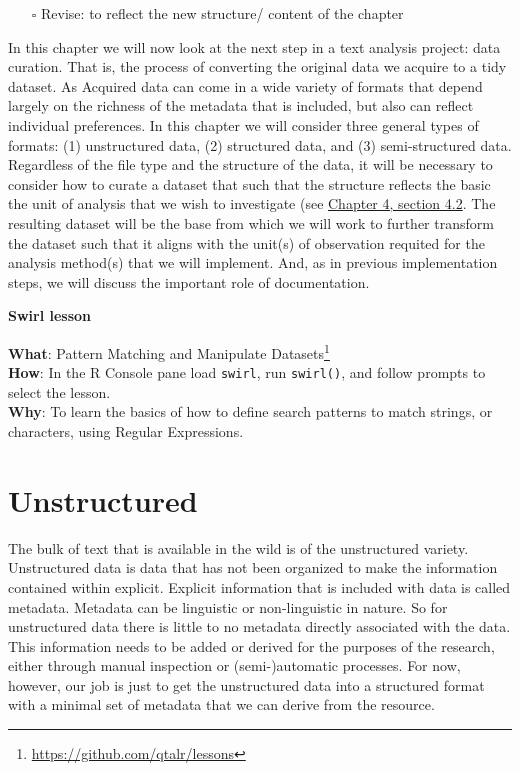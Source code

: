 \documentclass[
  letterpaper,
  DIV=11,
  numbers=noendperiod]{scrreport}
\providecommand{\tightlist}{%
  \setlength{\itemsep}{0pt}\setlength{\parskip}{0pt}}\usepackage{longtable,booktabs,array}
\theoremstyle{definition}
\theoremstyle{remark}
\DeclareRobustCommand{\href}[2]{#2\footnote{\url{#1}}}
\begin{document}
\begin{itemize}
\tightlist
\item[$\square$]
  Revise: to reflect the new structure/ content of the chapter
\end{itemize}

In this chapter we will now look at the next step in a text analysis
project: data curation. That is, the process of converting the original
data we acquire to a tidy dataset. As Acquired data can come in a wide
variety of formats that depend largely on the richness of the metadata
that is included, but also can reflect individual preferences. In this
chapter we will consider three general types of formats: (1)
unstructured data, (2) structured data, and (3) semi-structured data.
Regardless of the file type and the structure of the data, it will be
necessary to consider how to curate a dataset that such that the
structure reflects the basic the unit of analysis that we wish to
investigate (see
\protect\hyperlink{sec-framing-research.htmlux5cux23research-question}{Chapter
4, section 4.2}. The resulting dataset will be the base from which we
will work to further transform the dataset such that it aligns with the
unit(s) of observation requited for the analysis method(s) that we will
implement. And, as in previous implementation steps, we will discuss the
important role of documentation.

\begin{tcolorbox}[enhanced jigsaw, breakable, arc=.35mm, leftrule=.75mm, rightrule=.15mm, colback=white, toprule=.15mm, bottomrule=.15mm, opacityback=0, left=2mm]

\textbf{ Swirl lesson}

\textbf{What}: \href{https://github.com/qtalr/lessons}{Pattern Matching
and Manipulate Datasets}\\
\textbf{How}: In the R Console pane load \texttt{swirl}, run
\texttt{swirl()}, and follow prompts to select the lesson.\\
\textbf{Why}: To learn the basics of how to define search patterns to
match strings, or characters, using Regular Expressions.

\end{tcolorbox}

\hypertarget{unstructured}{%
\section{Unstructured}\label{unstructured}}

The bulk of text that is available in the wild is of the unstructured
variety. Unstructured data is data that has not been organized to make
the information contained within explicit. Explicit information that is
included with data is called metadata. Metadata can be linguistic or
non-linguistic in nature. So for unstructured data there is little to no
metadata directly associated with the data. This information needs to be
added or derived for the purposes of the research, either through manual
inspection or (semi-)automatic processes. For now, however, our job is
just to get the unstructured data into a structured format with a
minimal set of metadata that we can derive from the resource.
\end{document}
